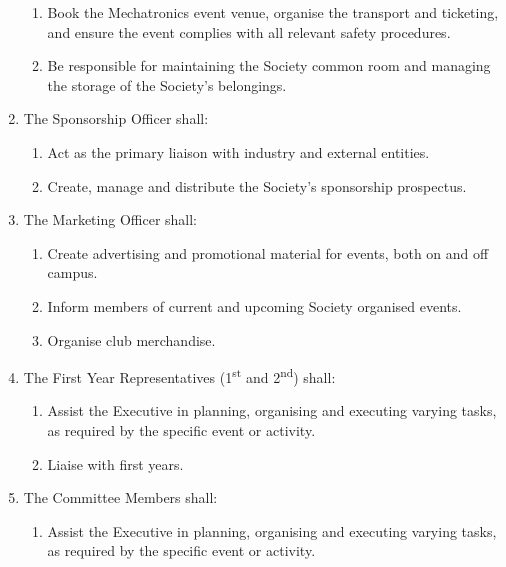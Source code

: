 \documentclass[11pt]{article}
\begin{document}
\begin{enumerate}[\thesection .1]
\begin{enumerate}
        \item Book the Mechatronics event venue, organise the transport and ticketing, and ensure the event complies with all relevant safety procedures.
        \item Be responsible for maintaining the Society common room and managing the storage of the Society's belongings.
    \end{enumerate}
    \item The Sponsorship Officer shall:
    \begin{enumerate}
        \item Act as the primary liaison with industry and external entities.
        \item Create, manage and distribute the Society's sponsorship prospectus.
    \end{enumerate}
    \item The Marketing Officer shall:
    \begin{enumerate}
        \item Create advertising and promotional material for events, both on and off campus.
        \item Inform members of current and upcoming Society organised events.
        \item Organise club merchandise.
    \end{enumerate}
    \item The First Year Representatives (1\textsuperscript{st} and 2\textsuperscript{nd})  shall:
    \begin{enumerate}
        \item Assist the Executive in planning, organising and executing varying tasks, as required by the specific event or activity.
        \item Liaise with first years.
    \end{enumerate}
    \item The Committee Members shall:
    \begin{enumerate}
        \item Assist the Executive in planning, organising and executing varying tasks, as required by the specific event or activity.
    \end{enumerate}
\end{enumerate}
\end{document}
